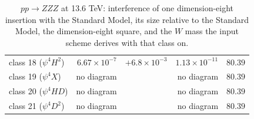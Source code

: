 \begin{table}[t]
\begin{tabular}{@{}lrrrr@{}}
class 18 ($\psi^4 H^2$) & $6.67\times 10^{-7}$ & $+6.8\times 10^{-3}$ & $1.13\times 10^{-11}$ & $80.39$\\
class 19 ($\psi^4 X$) & no diagram &  & no diagram & $80.39$\\
class 20 ($\psi^4 H D$) & no diagram &  & no diagram & $80.39$\\
class 21 ($\psi^4 D^2$) & no diagram &  & no diagram & $80.39$\\
\hline\end{tabular}
\caption{$p p \to Z Z Z$ at 13.6 TeV: interference of one dimension-eight insertion with the Standard Model, its size relative to the Standard Model, the dimension-eight square, and the $W$ mass the input scheme derives with that class on.}\label{tab:triboson-zzz}\end{table}

